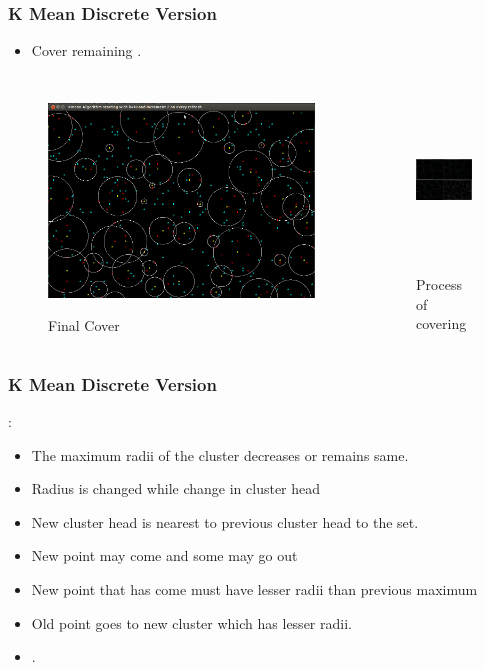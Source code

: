 \documentclass[blue]{beamer}
\begin{document}
\begin{frame}
\frametitle{ K Mean Discrete Version}
 \begin{itemize}
  \item Cover remaining {\color{red}{red points}}.
 \end{itemize}
  
  \begin{columns}
   {
  \begin{figure}[H]
     \caption{Final Cover}
        \centering
           \scalebox{1.0}
          {\includegraphics[width=\linewidth, height =1.6 in]{cover9.png}}
     \end{figure}
  }   
  {
  \begin{figure}[H]
  \caption{Process of covering}
        \centering
           \scalebox{1.0}
          {\includegraphics[width=\linewidth, height=1.6in]{cover12.png}}
   \end{figure}
  }
 \end{columns}
\end{frame}

\begin{frame}
 \frametitle{K Mean Discrete Version}
 {}:{\color{blue}{The K Mean Discrete Version Algorithm  converges.}}
 \begin{itemize}
  \item The maximum radii of the cluster decreases or remains same.
  \item Radius is changed while change in cluster head
  \item New cluster head is nearest to previous cluster head to the set.
  \item New point may come and some may go out
  \item New point that has come must have lesser radii than previous maximum 
  \item Old point goes to new cluster which has lesser radii.
  \item {\color{blue}{Hence in all cases maximum radius decreases or remains same}}.
  \end{itemize}
\end{frame}
\end{document}
